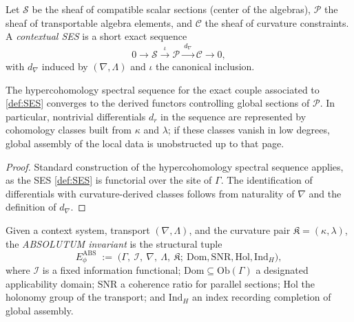 
\begin{definition}\label{def:SES}
Let $\mathcal S$ be the sheaf of compatible scalar sections (center of the algebras), $\mathcal P$ the sheaf of transportable algebra elements, and $\mathcal C$ the sheaf of curvature constraints. A \emph{contextual SES} is a short exact sequence
\[
0\longrightarrow \mathcal S\xrightarrow{\ \iota\ }\mathcal P\xrightarrow{\ d_\nabla\ }\mathcal C\longrightarrow 0,
\]
with $d_\nabla$ induced by $(\nabla,\Lambda)$ and $\iota$ the canonical inclusion.
\end{definition}

\begin{proposition}\label{prop:spectral-seq}
The hypercohomology spectral sequence for the exact couple associated to \eqref{def:SES} converges to the derived functors controlling global sections of $\mathcal P$. In particular, nontrivial differentials $d_r$ in the sequence are represented by cohomology classes built from $\kappa$ and $\lambda$; if these classes vanish in low degrees, global assembly of the local data is unobstructed up to that page.
\end{proposition}

\begin{proof}
Standard construction of the hypercohomology spectral sequence applies, as the SES \eqref{def:SES} is functorial over the site of $\Gamma$. The identification of differentials with curvature-derived classes follows from naturality of $\nabla$ and the definition of $d_\nabla$. \relax
\end{proof}


\begin{definition}\label{def:ABS-invariant}
Given a context system, transport $(\nabla,\Lambda)$, and the curvature pair $\mathfrak K=(\kappa,\lambda)$, the \emph{ABSOLUTUM invariant} is the structural tuple
\[
E_{\phi}^{\mathrm{ABS}}\;:=\;\big(\Gamma,\ \mathcal I,\ \nabla,\ \Lambda,\ \mathfrak K;\ \mathrm{Dom},\mathrm{SNR},\mathrm{Hol},\mathrm{Ind}_H\big),
\]
where $\mathcal I$ is a fixed information functional; $\mathrm{Dom}\subseteq\mathrm{Ob}(\Gamma)$ a designated applicability domain; $\mathrm{SNR}$ a coherence ratio for parallel sections; $\mathrm{Hol}$ the holonomy group of the transport; and $\mathrm{Ind}_H$ an index recording completion of global assembly.
\end{definition}

